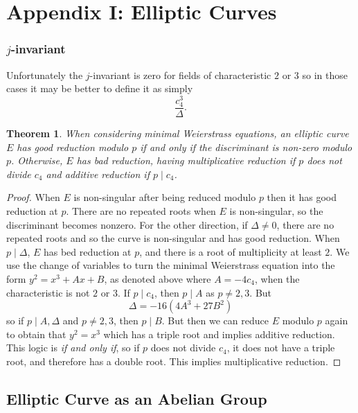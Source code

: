 \documentclass{article}
\newtheorem{theorem}{Theorem}[section]
\theoremstyle{definition}
\theoremstyle{definition}
\theoremstyle{definition}
\begin{document}
\section{Appendix I: Elliptic Curves}

\subsubsection{$j$-invariant}
Unfortunately the $j$-invariant is zero for fields of characteristic $2$ or $3$ so in those cases it may be better to define it as simply $$\frac{c_4^3}{\Delta}.$$


\begin{theorem}
    When considering minimal Weierstrass equations, an elliptic curve $E$ has good reduction modulo $p$ if and only if the discriminant is non-zero modulo $p$. Otherwise, $E$ has bad reduction, having multiplicative reduction if $p$ does not divide $c_4$ and additive reduction if $p\mid c_4$.
\end{theorem}

\begin{proof}
    When $E$ is non-singular after being reduced modulo $p$ then it has good reduction at $p$. There are no repeated roots when $E$ is non-singular, so the discriminant becomes nonzero. For the other direction, if $\Delta\neq 0$, there are no repeated roots and so the curve is non-singular and has good reduction.
\newline\newline
    When $p\mid \Delta$, $E$ has bed reduction at $p$, and there is a root of multiplicity at least $2$. We use the change of variables to turn the minimal Weierstrass equation into the form $y^2=x^3+Ax+B$, as denoted above where $A=-4c_4$, when the characteristic is not $2$ or $3$. If $p\mid c_4$, then $p\mid A$ as $p\neq 2,3$. 
    But $$\Delta=-16(4A^3+27B^2)$$ so if $p\mid A,\Delta$ and $p\neq 2,3$, then $p\mid B$. But then we can reduce $E$ modulo $p$ again to obtain that $y^2=x^3$ which has a triple root and implies additive reduction. This logic is \textit{if and only if}, so if $p$ does not divide $c_4$, it does not have a triple root, and therefore has a double root. This implies multiplicative reduction.
\end{proof}

\subsection{Elliptic Curve as an Abelian Group}
\end{document}

